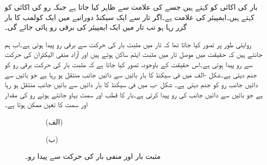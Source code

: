 بار کی اکائی کو  کہتے ہیں جسے  کی علامت سے ظاہر کیا جاتا ہے جبکہ رو کی اکائی کو  کہتے ہیں۔ایمپیئر کی علامت  ہے۔اگر تار سے ایک سیکنڈ دورانیے میں ایک کولمب کا بار گزر رہا ہو تب تار میں ایک ایمپیئر کی برقی رو پائی جائے گی۔

روایتی طور پر تصور کیا جاتا تھا کہ تار میں مثبت بار کی حرکت سے برقی رو پیدا ہوتی ہے۔اب ہم جانتے ہیں کہ حقیقت میں موصل تار میں مثبت ایٹم ساکن ہوتے ہیں اور آزاد منفی الیکٹران کی  حرکت سے  رو پیدا ہوتی ہے۔اس حقیقت کے باوجود، تصور کیا جاتا ہے کہ مثبت بار کی حرکت برقی رو کو جنم دیتی ہے۔شکل -الف میں فی سیکنڈ  کا بار بائیں سے دائیں جانب منتقل ہو رہا ہے جو بائیں سے دائیں جانب  رو کو جنم دیتی ہے۔ شکل -ب میں فی سیکنڈ   کا بار دائیں سے بائیں جانب منتقل ہو رہا ہے جو بائیں سے دائیں جانب  کی رو پیدا کرتی ہے۔بار کا قطب اور سمت بہاو جانتے ہوئے رو کی مقدار اور سمت کا تعین ممکن ہوتا ہے۔
\begin{figure}
\centering
\begin{subfigure}{0.5\textwidth}
\centering
{}
\caption*{(الف)}
\end{subfigure}%
\begin{subfigure}{0.5\textwidth}
\centering
{}
\caption*{(ب)}
\end{subfigure}%
\caption{مثبت بار اور منفی بار کی حرکت سے پیدا رو۔}
\label{شکل_بنیادی_مثبت_منفی_بار_رو}
\end{figure}

